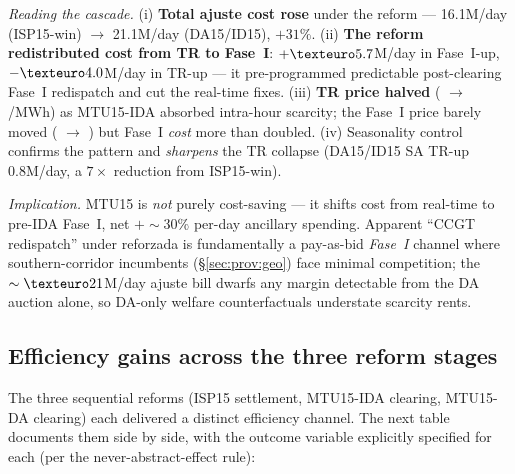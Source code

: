 \documentclass[11pt,a4paper]{article}
\begin{document}
\textit{Reading the cascade.} (i) \textbf{Total ajuste cost rose} under the reform --- \texteuro 16.1M/day (ISP15-win) $\to$ \texteuro 21.1M/day (DA15/ID15), $+31\%$. (ii) \textbf{The reform redistributed cost from TR to Fase~I}: $+\texteuro 5.7$M/day in Fase~I-up, $-\texteuro 4.0$M/day in TR-up --- it pre-programmed predictable post-clearing Fase~I redispatch and cut the real-time fixes. (iii) \textbf{TR price halved} ( $\to$ /MWh) as MTU15-IDA absorbed intra-hour scarcity; the Fase~I price barely moved ( $\to$ ) but Fase~I \emph{cost} more than doubled. (iv) Seasonality control confirms the pattern and \emph{sharpens} the TR collapse (DA15/ID15 SA TR-up \texteuro 0.8M/day, a $7\times$ reduction from ISP15-win).

\textit{Implication.} MTU15 is \emph{not} purely cost-saving --- it shifts cost from real-time to pre-IDA Fase~I, net $+\sim 30\%$ per-day ancillary spending. Apparent ``CCGT redispatch'' under reforzada is fundamentally a pay-as-bid \emph{Fase~I} channel where southern-corridor incumbents (\S\ref{sec:prov:geo}) face minimal competition; the $\sim\texteuro 21$M/day ajuste bill dwarfs any margin detectable from the DA auction alone, so DA-only welfare counterfactuals understate scarcity rents.

\subsection{Efficiency gains across the three reform stages}\label{sec:prov:full_cascade:efficiency}

The three sequential reforms (ISP15 settlement, MTU15-IDA clearing, MTU15-DA clearing) each delivered a distinct efficiency channel. The next table documents them side by side, with the outcome variable explicitly specified for each (per the never-abstract-effect rule):
\end{document}

